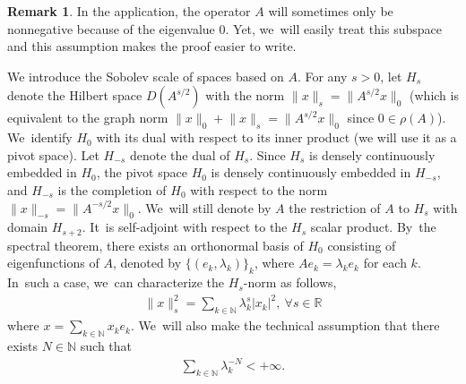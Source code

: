 \documentclass[JEP,XML,SOM,Unicode,published]{cedram}
\theoremstyle{definition}
\newtheorem{remark}[theorem]{Remark}
\let\ld\lambda
\newcommand{\R}{\mathbb{R}}
\newcommand{\N}{\mathbb{N}}
\providecommand{\norm}[1]{\lVert#1\rVert}
\begin{document}
\begin{remark}
In the application, the operator $A$ will sometimes only be nonnegative because of the eigenvalue $0$. Yet, we~will easily treat this subspace and this assumption makes the proof easier to write.
\end{remark}

We introduce the Sobolev scale of spaces based on $A$. For any $s>0$, let $H_s$ denote the Hilbert space $D(A^{s/2})$ with the norm $\norm{x}_s=\norm{A^{s/2}x}_{0}$ (which is equivalent to the graph norm $\norm{x}_{0}+\norm{x}_s=\norm{A^{s/2}x}_{0}$ since $0\in \rho(A)$). We~identify $H_0$ with its dual with respect to its inner product (\ie we will use it as a pivot space). Let $H_{-s}$ denote the dual of $H_s$. Since $H_s$ is densely continuously embedded in $H_0$, the pivot space $H_0$ is densely continuously embedded in $H_{-s}$, and $H_{-s}$ is the completion of $H_0$ with respect to the norm $\norm{x}_{-s}=\norm{A^{-s/2}x}_0$. We~will still denote by $A$ the restriction of $A$ to $H_s$ with domain $H_{s+2}$. It~is self-adjoint with respect to the $H_s$ scalar product. By~the spectral theorem, there exists an orthonormal basis of $H_0$ consisting of eigenfunctions of $A$, denoted by $\{(e_k, \ld_k)\}_k$, where $Ae_k=\ld_k e_k$ for each $k$. In~such a case, we~can characterize the $H_s$-norm as follows,
\begin{align*}
\norm{x}_s^2=\sum_{k\in \N} \ld_k^{s}|x_k|^2,\ \forall s\in \R
\end{align*}
where $x=\sum_{k\in \N} x_ke_k$. We~will also make the technical assumption that there exists $N\in \N$ such that
\begin{align}
\label{hypWeyl} \sum_{k\in \N}\ld_k^{-N}<+\infty.
\end{align}
\end{document}
